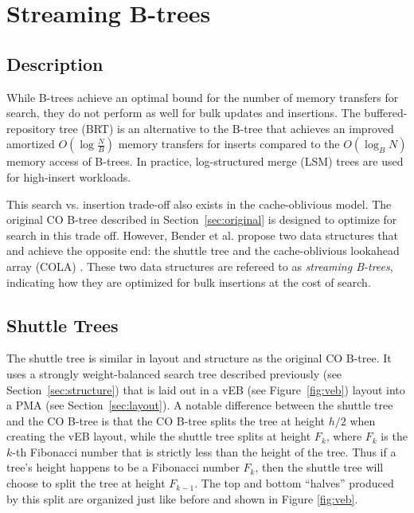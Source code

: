 \documentclass[preprint]{style}
\begin{document}
\section{Streaming B-trees}

\subsection{Description}

While B-trees achieve an optimal bound for the number of memory transfers for
search, they do not perform as well for bulk updates and insertions. The
buffered-repository tree (BRT) is an alternative to the B-tree that achieves an
improved amortized $O(\log{\frac{N}{B}})$ memory transfers for inserts compared
to the $O(\log_{B}{N})$ memory access of B-trees. In practice, log-structured
merge (LSM) trees \cite{ONeil96} are used for high-insert workloads.

This search vs. insertion trade-off also exists in the cache-oblivious model.
The original CO B-tree described in Section~\ref{sec:original} is designed to
optimize for search in this trade off. However, Bender et al. propose two data
structures that and achieve the opposite end: the shuttle tree and the
cache-oblivious lookahead array (COLA) \cite{BenderFaFi07}. These two data
structures are refereed to as \textit{streaming B-trees}, indicating how they
are optimized for bulk insertions at the cost of search.

\subsection{Shuttle Trees}

The shuttle tree is similar in layout and structure as the original CO B-tree.
It uses a strongly weight-balanced search tree described previously (see
Section~\ref{sec:structure}) that is laid out in a vEB (see
Figure~\ref{fig:veb}) layout into a PMA (see Section~\ref{sec:layout}). A
notable difference between the shuttle tree and the CO B-tree is that the CO
B-tree splits the tree at height $h/2$ when creating the vEB layout, while the
shuttle tree splits at height $F_k$, where $F_k$ is the $k$-th Fibonacci number
that is strictly less than the height of the tree. Thus if a tree's height
happens to be a Fibonacci number $F_k$, then the shuttle tree will choose to
split the tree at height $F_{k-1}$. The top and bottom ``halves'' produced by
this split are organized just like before and shown in Figure \ref{fig:veb}.
\end{document}

